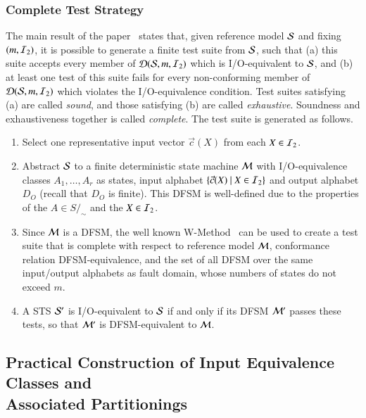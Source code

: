 \subsubsection{Complete Test Strategy}\label{sec:competestrat}

The main result of the paper~\cite{peleska2013ictss} states that, given reference model ${\cal S}$ and fixing $(m,{\cal I}_2)$, it is possible to generate a finite  test suite from ${\cal S}$, such that 
 (a) this suite accepts every member of  ${\cal D}({\cal S},m,{\cal I}_2)$ which is I/O-equivalent to ${\cal S}$, and (b) at least one test of this suite fails for every non-conforming member of
${\cal D}({\cal S},m,{\cal I}_2)$ 
which violates the I/O-equivalence condition. Test suites satisfying  (a) 
are called {\it sound}, and those satisfying (b) are called {\it exhaustive}. Soundness and exhaustiveness together  is called {\it complete}. The test suite is generated as follows.
\begin{enumerate}
\item Select one representative input vector $\vec c(X)$ from each   $X\in {\cal I}_2$.
\item Abstract ${\cal S}$ to a finite deterministic state machine ${\cal M}$ with I/O-equivalence classes $A_1,\dots,A_r$ as states, input alphabet $\{\vec c(X)~|~X\in {\cal I}_2\}$ and output alphabet 
$D_O$ (recall that $D_O$ is finite). This DFSM is well-defined due to the properties of the $A\in S/_\sim$ and the $X\in {\cal I}_2$.  
\item Since ${\cal M}$ is a DFSM, the well known W-Method~\cite{vasilevskii1973,chow:wmethod} 
can be used to create a test suite that is complete with respect to reference model ${\cal M}$, conformance relation DFSM-equivalence, and the set of all DFSM over the same input/output alphabets as fault domain, whose
numbers of states do not exceed $m$.
\item A STS ${\cal S}'$ is I/O-equivalent to ${\cal S}$ if and only if its DFSM ${\cal M}'$ passes these tests, so that ${\cal M}'$ is DFSM-equivalent to ${\cal M}$. 
\end{enumerate}






\subsection[Practical Construction of Input Equivalence Classes and Associated Partitionings]{Practical Construction of Input Equivalence Classes and\\Associated Partitionings}\label{sec:csmiecp}



